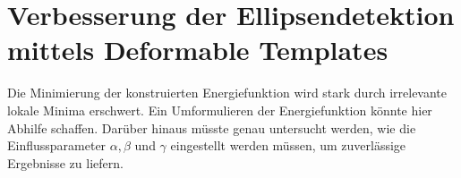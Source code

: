 \section{Verbesserung der Ellipsendetektion mittels Deformable Templates}
Die Minimierung der konstruierten Energiefunktion wird stark durch irrelevante lokale Minima erschwert. Ein Umformulieren der Energiefunktion könnte hier Abhilfe schaffen.
Darüber hinaus müsste genau untersucht werden, wie die Einflussparameter $\alpha,\beta$ und $\gamma$ eingestellt werden müssen, um zuverlässige Ergebnisse zu liefern.
